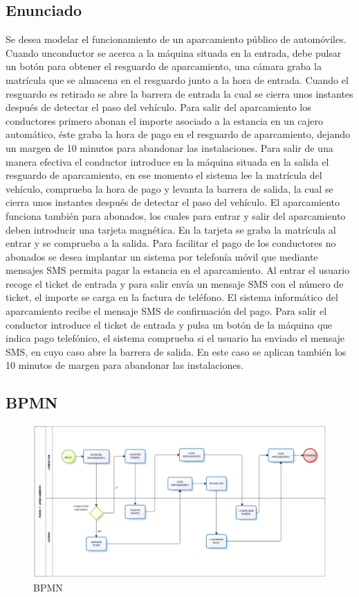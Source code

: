 \documentclass[12pt,letterpaper]{article}
\begin{document}
\subsection{Enunciado}
Se desea modelar el funcionamiento de un aparcamiento público de automóviles. Cuando unconductor se acerca a la máquina situada en la entrada, debe pulsar un botón para obtener el resguardo de aparcamiento, una cámara graba la matrícula que se almacena en el resguardo junto a la hora de entrada. Cuando el resguardo es retirado se abre la barrera de entrada la cual se cierra unos instantes después de detectar el paso del vehículo. Para salir del aparcamiento los conductores primero abonan el importe asociado a la estancia en un cajero automático, éste graba la hora de pago en el resguardo de aparcamiento, dejando un margen de 10 minutos para abandonar las instalaciones. Para salir de una manera efectiva el conductor introduce en la máquina situada en la salida el resguardo de aparcamiento, en ese momento el sistema lee la matrícula del vehículo, comprueba la hora de pago y levanta la barrera de salida, la cual se cierra unos instantes después de detectar el paso del vehículo. El aparcamiento funciona también para abonados, los cuales para entrar y salir del aparcamiento deben introducir una tarjeta magnética. En la tarjeta se graba la matrícula al entrar y se comprueba a la salida. Para facilitar el pago de los conductores no abonados se desea implantar un sistema por telefonía móvil que mediante mensajes SMS permita pagar la estancia en el aparcamiento. Al entrar el usuario recoge el ticket de entrada y para salir envía un mensaje SMS con el número de ticket, el importe se carga en la factura de teléfono. El sistema informático del aparcamiento recibe el mensaje SMS de confirmación del pago. Para salir el conductor introduce el ticket de entrada y pulsa un botón de la máquina que indica pago telefónico, el sistema comprueba si el usuario ha enviado el mensaje SMS, en cuyo caso abre la barrera de salida. En este caso se aplican también los 10 minutos de margen para abandonar las instalaciones.\\

\subsection{BPMN}
	\begin{figure}[H]
		\centering
		\includegraphics[scale=0.5]{img/ejemplobpmn.PNG}    
		\caption{BPMN }
	\label{fig:rc}
	\end{figure}
	\vspace{1cm}
\end{document}
